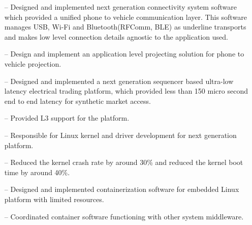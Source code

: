 \documentclass[10pt,a4paper,roman]{moderncv}        %
\begin{document}
\begin{itemize}
  \item[--]{Designed and implemented next generation connectivity system
    software which provided a unified phone to vehicle communication layer.
    This software manages USB, Wi-Fi and Bluetooth(RFComm, BLE) as underline transports
    and makes low level connection details agnostic to the application used.}
  \item[--]{Design and implement an application level projecting solution for phone to vehicle projection.}
\end{itemize}

\begin{itemize}
  \item[--]{Designed and implemented a next generation sequencer based ultra-low
    latency electrical trading platform, which provided less than 150 micro
  second end to end latency for synthetic market access.}
  \item[--]{Provided L3 support for the platform.}
\end{itemize}

\begin{itemize}
  \item[--]{Responsible for Linux kernel and driver development for next
    generation platform. }
  \item[--]{Reduced the kernel crash rate by around 30\% and reduced the kernel boot time by around 40\%.}
  \item[--]{Designed and implemented containerization software for embedded Linux
    platform with limited resources.}
  \item[--]{Coordinated container software functioning with other system middleware.}
\end{itemize}
\end{document}
